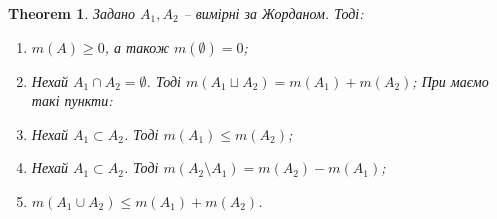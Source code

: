 \documentclass[a4paper, 10pt]{article}
\theoremstyle{theoremdd}
\newtheorem{theorem}{Theorem}[subsection]
\theoremstyle{theoremdd}
\theoremstyle{theoremdd}
\theoremstyle{theoremdd}
\theoremstyle{theoremdd}
\theoremstyle{theoremdd}
\theoremstyle{theoremdd}
\theoremstyle{theoremdd}
\theoremstyle{theoremdd}
\theoremstyle{theoremdd}
\theoremstyle{theoremdd}
\theoremstyle{theoremdd}
\theoremstyle{theoremdd}
\theoremstyle{theoremdd}
\theoremstyle{theoremdd}
\begin{document}
\begin{theorem}
Задано $A_1,A_2$ -- вимірні за Жорданом. Тоді:
\begin{enumerate}[nosep,wide=0pt,label={\arabic*)}]
\item $m(A) \geq 0$, а також $m(\emptyset) = 0$;
\item Нехай $A_1 \cap A_2 = \emptyset$. Тоді $m(A_1 \sqcup A_2) = m(A_1) + m(A_2)$;
При  маємо такі пункти:
\item Нехай $A_1 \subset A_2$. Тоді $m(A_1) \leq m(A_2)$;
\item Нехай $A_1 \subset A_2$. Тоді $m(A_2 \setminus A_1) = m(A_2) - m(A_1)$;
\item $m(A_1 \cup A_2) \leq m(A_1) + m(A_2)$.
\end{enumerate}
\end{theorem}
\end{document}
